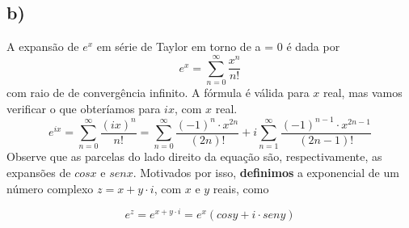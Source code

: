 \documentclass[a4paper, 12pt]{article}
\begin{document}
\subsection{b)}

A expansão de $e^x$ em série de Taylor em torno de a = 0 é dada por
$$e^x = \sum_{n=0}^{\infty}\frac{x^n}{n!}$$
com raio de de convergência infinito. A fórmula é válida para $x$ real, mas vamos verificar o que obteríamos para $ix$, com $x$ real.
$$e^{ix} = \sum_{n=0}^{\infty}\frac{(ix)^n}{n!}=\sum_{n=0}^{\infty}\frac{(-1)^n\cdot x^{2n}}{(2n)!}+i\sum_{n=1}^{\infty}\frac{(-1)^{n-1}\cdot x^{2n-1}}{(2n-1)!}$$
Observe que as parcelas do lado direito da equação são, respectivamente, as expansões de $cosx$ e $senx$. Motivados por isso, \textbf{definimos} a exponencial de um número complexo $z = x + y\cdot i$, com $x$ e $y$ reais, como 

$$e^z=e^{x + y\cdot i}=e^x(cosy + i\cdot seny)$$ 
\end{document}
